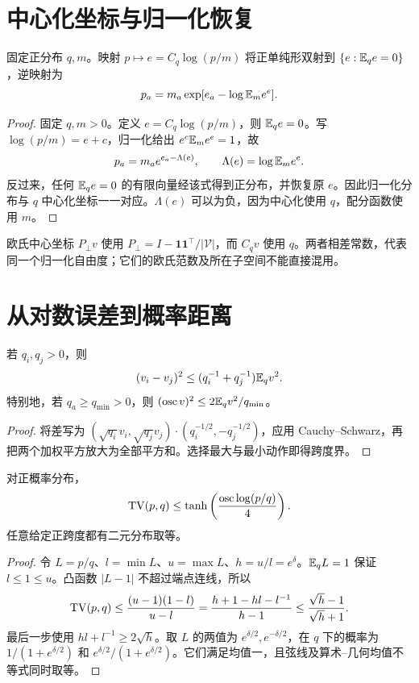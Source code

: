 \section{中心化坐标与归一化恢复}
\begin{proposition}[中心化误差与概率分布的双射]
固定正分布 $q,m$。映射 $p\mapsto e=C_q\log(p/m)$ 将正单纯形双射到 $\{e:\mathbb E_qe=0\}$，逆映射为
\begin{equation}
p_a=m_a\exp[e_a-\log\mathbb E_me^e].
\end{equation}
\end{proposition}
\begin{proof}
固定 $q,m>0$。定义 $e=C_q\log(p/m)$，则 $\mathbb E_qe=0$。写 $\log(p/m)=e+c$，归一化给出 $e^c\mathbb E_me^e=1$，故
\begin{equation}
p_a=m_a e^{e_a-\Lambda(e)},\qquad
\Lambda(e)=\log\mathbb E_me^e.
\label{eq:quotient-inverse-core}
\end{equation}
反过来，任何 $\mathbb E_qe=0$ 的有限向量经该式得到正分布，并恢复原 $e$。因此归一化分布与 $q$ 中心化坐标一一对应。$\Lambda(e)$ 可以为负，因为中心化使用 $q$，配分函数使用 $m$。
\end{proof}

欧氏中心坐标 $P_\perp v$ 使用 $P_\perp=I-\mathbf1\mathbf1^\top/|\mathcal V|$，而 $C_qv$ 使用 $q$。两者相差常数，代表同一个归一化自由度；它们的欧氏范数及所在子空间不能直接混用。

\section{从对数误差到概率距离}
\begin{lemma}[加权误差控制跨度]
若 $q_i,q_j>0$，则
\begin{equation}
(v_i-v_j)^2\le(q_i^{-1}+q_j^{-1})\mathbb E_qv^2.
\end{equation}
特别地，若 $q_a\ge q_{\min}>0$，则 $(\operatorname{osc} v)^2\le2\mathbb E_qv^2/q_{\min}$。
\end{lemma}
\begin{proof}
将差写为 $(\sqrt{q_i}v_i,\sqrt{q_j}v_j)\cdot(q_i^{-1/2},-q_j^{-1/2})$，应用 Cauchy--Schwarz，再把两个加权平方放大为全部平方和。选择最大与最小动作即得跨度界。
\end{proof}

\begin{theorem}
\label{thm:hilbert-tv}
对正概率分布，
\begin{equation}
\operatorname{TV}(p,q)\le\tanh\left(\frac{\operatorname{osc}\log(p/q)}4\right).
\end{equation}
任意给定正跨度都有二元分布取等。
\end{theorem}
\begin{proof}
令 $L=p/q$、$l=\min L$、$u=\max L$、$h=u/l=e^\delta$。$\mathbb E_qL=1$ 保证 $l\le1\le u$。凸函数 $|L-1|$ 不超过端点连线，所以
\begin{equation}
\operatorname{TV}(p,q)\le\frac{(u-1)(1-l)}{u-l}
=\frac{h+1-hl-l^{-1}}{h-1}
\le\frac{\sqrt h-1}{\sqrt h+1}.
\end{equation}
最后一步使用 $hl+l^{-1}\ge2\sqrt h$。取 $L$ 的两值为 $e^{\delta/2},e^{-\delta/2}$，在 $q$ 下的概率为 $1/(1+e^{\delta/2})$ 和 $e^{\delta/2}/(1+e^{\delta/2})$。它们满足均值一，且弦线及算术--几何均值不等式同时取等。
\end{proof}

